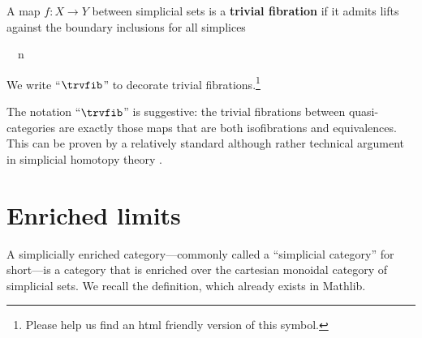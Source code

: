   \begin{definition}\label{defn:qcat-trivial-fibration}
    \leanok
     A map $f \colon X \to Y$ between simplicial sets is a \textbf{trivial fibration} if it admits lifts against the boundary inclusions for all simplices
  \begin{center}
   \qquad {}\ \ n 
\end{center}
  We write ``$\trvfib$'' to decorate trivial fibrations.\footnote{Please help us find an html friendly version of this symbol.}
  \end{definition}


  The notation ``$\trvfib$'' is suggestive: the trivial fibrations between quasi-cat\-e\-go\-ries are exactly those maps that are both isofibrations and equivalences. This can be proven by a relatively standard although rather technical argument in simplicial homotopy theory \cite[D.5.6]{RiehlVerity:2022eo}.

\section{Enriched limits}\label{sec:enriched-limits}

A simplicially enriched category---commonly called a ``simplicial category'' for short---is a category that is enriched over the cartesian monoidal category of simplicial sets. We recall the definition, which already exists in Mathlib.

